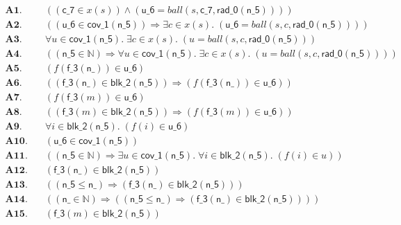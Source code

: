 \documentclass[11pt]{article}
\begin{document}
\begin{align*}
  \mathbf{A1.}\quad & ((\mathsf{c\_7} \in x(s)) \wedge (\mathsf{u\_6} = \mathit{ball}(s, \mathsf{c\_7}, \mathsf{rad\_0}(\mathsf{n\_5})))) \\
  \mathbf{A2.}\quad & ((\mathsf{u\_6} \in \mathsf{cov\_1}(\mathsf{n\_5})) \Rightarrow \exists c \in x(s).\; (\mathsf{u\_6} = \mathit{ball}(s, c, \mathsf{rad\_0}(\mathsf{n\_5})))) \\
  \mathbf{A3.}\quad & \forall u \in \mathsf{cov\_1}(\mathsf{n\_5}).\; \exists c \in x(s).\; (u = \mathit{ball}(s, c, \mathsf{rad\_0}(\mathsf{n\_5}))) \\
  \mathbf{A4.}\quad & ((\mathsf{n\_5} \in \mathbb{N}) \Rightarrow \forall u \in \mathsf{cov\_1}(\mathsf{n\_5}).\; \exists c \in x(s).\; (u = \mathit{ball}(s, c, \mathsf{rad\_0}(\mathsf{n\_5})))) \\
  \mathbf{A5.}\quad & (f(\mathsf{f\_3}(\mathsf{n\_})) \in \mathsf{u\_6}) \\
  \mathbf{A6.}\quad & ((\mathsf{f\_3}(\mathsf{n\_}) \in \mathsf{blk\_2}(\mathsf{n\_5})) \Rightarrow (f(\mathsf{f\_3}(\mathsf{n\_})) \in \mathsf{u\_6})) \\
  \mathbf{A7.}\quad & (f(\mathsf{f\_3}(m)) \in \mathsf{u\_6}) \\
  \mathbf{A8.}\quad & ((\mathsf{f\_3}(m) \in \mathsf{blk\_2}(\mathsf{n\_5})) \Rightarrow (f(\mathsf{f\_3}(m)) \in \mathsf{u\_6})) \\
  \mathbf{A9.}\quad & \forall i \in \mathsf{blk\_2}(\mathsf{n\_5}).\; (f(i) \in \mathsf{u\_6}) \\
  \mathbf{A10.}\quad & (\mathsf{u\_6} \in \mathsf{cov\_1}(\mathsf{n\_5})) \\
  \mathbf{A11.}\quad & ((\mathsf{n\_5} \in \mathbb{N}) \Rightarrow \exists u \in \mathsf{cov\_1}(\mathsf{n\_5}).\; \forall i \in \mathsf{blk\_2}(\mathsf{n\_5}).\; (f(i) \in u)) \\
  \mathbf{A12.}\quad & (\mathsf{f\_3}(\mathsf{n\_}) \in \mathsf{blk\_2}(\mathsf{n\_5})) \\
  \mathbf{A13.}\quad & ((\mathsf{n\_5} \leq \mathsf{n\_}) \Rightarrow (\mathsf{f\_3}(\mathsf{n\_}) \in \mathsf{blk\_2}(\mathsf{n\_5}))) \\
  \mathbf{A14.}\quad & ((\mathsf{n\_} \in \mathbb{N}) \Rightarrow ((\mathsf{n\_5} \leq \mathsf{n\_}) \Rightarrow (\mathsf{f\_3}(\mathsf{n\_}) \in \mathsf{blk\_2}(\mathsf{n\_5})))) \\
  \mathbf{A15.}\quad & (\mathsf{f\_3}(m) \in \mathsf{blk\_2}(\mathsf{n\_5})) \\

\end{align*}
\end{document}
